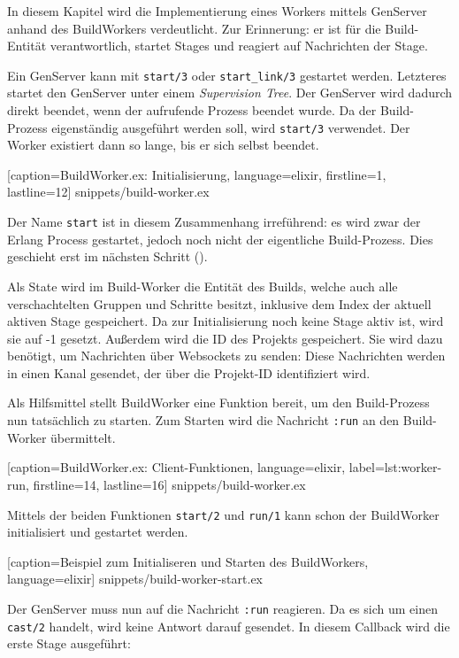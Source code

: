 In diesem Kapitel wird die Implementierung eines Workers mittels GenServer anhand des BuildWorkers verdeutlicht. Zur Erinnerung: er ist für die Build-Entität verantwortlich, startet Stages und reagiert auf Nachrichten der Stage.

Ein GenServer kann mit \texttt{start/3} oder \texttt{start\_link/3} gestartet werden. Letzteres startet den GenServer unter einem \emph{Supervision Tree}. Der GenServer wird dadurch direkt beendet, wenn der aufrufende Prozess beendet wurde. Da der Build-Prozess eigenständig ausgeführt werden soll, wird \texttt{start/3} verwendet. Der Worker existiert dann so lange, bis er sich selbst beendet.


  [caption={BuildWorker.ex: Initialisierung},
  language=elixir,
  firstline=1,
  lastline=12]
  {snippets/build-worker.ex}

Der Name \texttt{start} ist in diesem Zusammenhang irreführend: es wird zwar der Erlang Process gestartet, jedoch noch nicht der eigentliche Build-Prozess. Dies geschieht erst im nächsten Schritt ().

Als State wird im Build-Worker die Entität des Builds, welche auch alle verschachtelten Gruppen und Schritte besitzt, inklusive dem Index der aktuell aktiven Stage gespeichert. Da zur Initialisierung noch keine Stage aktiv ist, wird sie auf -1 gesetzt. Außerdem wird die ID des Projekts gespeichert. Sie wird dazu benötigt, um Nachrichten über Websockets zu senden: Diese Nachrichten werden in einen Kanal gesendet, der über die Projekt-ID identifiziert wird.

Als Hilfsmittel stellt BuildWorker eine Funktion bereit, um den Build-Prozess nun tatsächlich zu starten. Zum Starten wird die Nachricht \texttt{:run} an den Build-Worker übermittelt.


  [caption={BuildWorker.ex: Client-Funktionen},
  language=elixir,
  label={lst:worker-run},
  firstline=14,
  lastline=16]
  {snippets/build-worker.ex}

Mittels der beiden Funktionen \texttt{start/2} und \texttt{run/1} kann schon der BuildWorker initialisiert und gestartet werden.


  [caption={Beispiel zum Initialiseren und Starten des BuildWorkers},
  language=elixir]
  {snippets/build-worker-start.ex}

Der GenServer muss nun auf die Nachricht \texttt{:run} reagieren. Da es sich um einen \texttt{cast/2} handelt, wird keine Antwort darauf gesendet. In diesem Callback wird die erste Stage ausgeführt:

